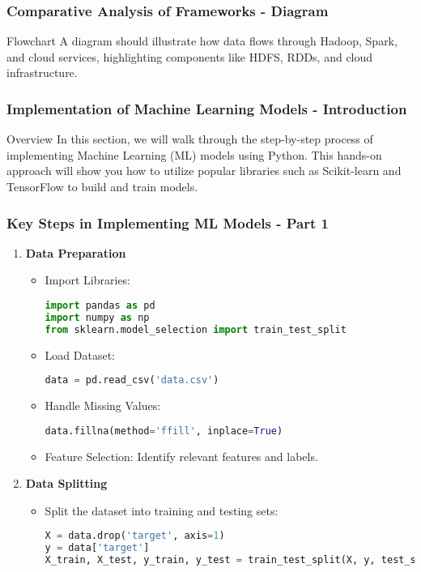 \documentclass[aspectratio=169]{beamer}
\begin{document}
\begin{frame}[fragile]
    \frametitle{Comparative Analysis of Frameworks - Diagram}
    \begin{block}{Flowchart}
        A diagram should illustrate how data flows through Hadoop, Spark, and cloud services, highlighting components like HDFS, RDDs, and cloud infrastructure.
    \end{block}
\end{frame}

\begin{frame}[fragile]
    \frametitle{Implementation of Machine Learning Models - Introduction}
    \begin{block}{Overview}
    In this section, we will walk through the step-by-step process of implementing Machine Learning (ML) models using Python. This hands-on approach will show you how to utilize popular libraries such as Scikit-learn and TensorFlow to build and train models.
    \end{block}
\end{frame}

\begin{frame}[fragile]
    \frametitle{Key Steps in Implementing ML Models - Part 1}
    \begin{enumerate}
        \item \textbf{Data Preparation}
        \begin{itemize}
            \item Import Libraries:
            \begin{lstlisting}[language=Python]
import pandas as pd
import numpy as np
from sklearn.model_selection import train_test_split
            \end{lstlisting}
            \item Load Dataset:
            \begin{lstlisting}[language=Python]
data = pd.read_csv('data.csv')
            \end{lstlisting}
            \item Handle Missing Values:
            \begin{lstlisting}[language=Python]
data.fillna(method='ffill', inplace=True)
            \end{lstlisting}
            \item Feature Selection: Identify relevant features and labels.
        \end{itemize}
        
        \item \textbf{Data Splitting}
        \begin{itemize}
            \item Split the dataset into training and testing sets:
            \begin{lstlisting}[language=Python]
X = data.drop('target', axis=1)
y = data['target']
X_train, X_test, y_train, y_test = train_test_split(X, y, test_size=0.2, random_state=42)
            \end{lstlisting}
        \end{itemize}
    \end{enumerate}
\end{frame}
\end{document}
